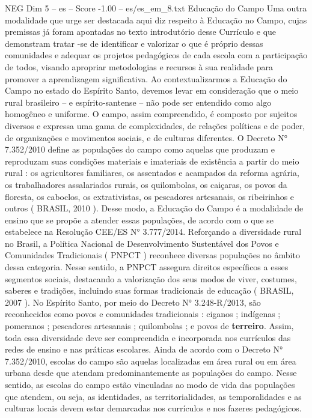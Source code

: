 \begin{textsample}{NEG Dim 5 – es – Score -1.00 – es/es\_em\_8.txt}  \label{ex:f5_neg_187}
Educação do Campo Uma outra modalidade que urge ser destacada aqui diz respeito à Educação no Campo, cujas premissas já foram apontadas no texto introdutório desse Currículo e que demonstram tratar -se de identificar e valorizar o que é próprio dessas comunidades e adequar os projetos pedagógicos de cada escola com a participação de todos, visando apropriar metodologias e recursos à sua realidade para promover a aprendizagem significativa.
Ao contextualizarmos a Educação do Campo no estado do Espírito Santo, devemos levar em consideração que o meio rural brasileiro – e espírito-santense – não pode ser entendido como algo homogêneo e uniforme.
O campo, assim compreendido, é composto por sujeitos diversos e expressa uma gama de complexidades, de relações políticas e de poder, de organizações e movimentos sociais, e de culturas diferentes.
O Decreto N{\EmojiFont °} 7.352/2010 define as populações do campo como aquelas que produzam e reproduzam suas condições materiais e imateriais de existência a partir do meio rural : os agricultores familiares, os assentados e acampados da reforma agrária, os trabalhadores assalariados rurais, os quilombolas, os caiçaras, os povos da floresta, os caboclos, os extrativistas, os pescadores artesanais, os ribeirinhos e outros ( BRASIL, 2010 ).
Desse modo, a Educação do Campo é a modalidade de ensino que se propõe a atender essas populações, de acordo com o que se estabelece na Resolução CEE/ES N{\EmojiFont °} 3.777/2014.
Reforçando a diversidade rural no Brasil, a Política Nacional de Desenvolvimento Sustentável dos Povos e Comunidades Tradicionais ( PNPCT ) reconhece diversas populações no âmbito dessa categoria.
Nesse sentido, a PNPCT assegura direitos específicos a esses segmentos sociais, destacando a valorização dos seus modos de viver, costumes, saberes e tradições, incluindo suas formas tradicionais de educação ( BRASIL, 2007 ).
No Espírito Santo, por meio do Decreto N{\EmojiFont °} 3.248-R/2013, são reconhecidos como povos e comunidades tradicionais : ciganos ; indígenas ; pomeranos ; pescadores artesanais ; quilombolas ; e povos de \textbf{terreiro}.
Assim, toda essa diversidade deve ser compreendida e incorporada nos currículos das redes de ensino e nas práticas escolares.
Ainda de acordo com o Decreto N{\EmojiFont °} 7.352/2010, escolas do campo são aquelas localizadas em área rural ou em área urbana desde que atendam predominantemente as populações do campo.
Nesse sentido, as escolas do campo estão vinculadas ao modo de vida das populações que atendem, ou seja, as identidades, as territorialidades, as temporalidades e as culturas locais devem estar demarcadas nos currículos e nos fazeres pedagógicos.

\end{textsample}

